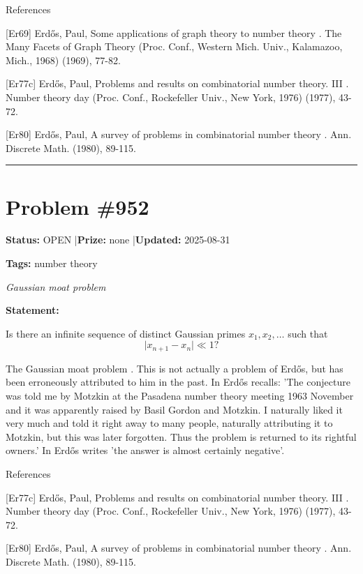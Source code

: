 \documentclass{article}
\begin{document}
References

[Er69] Erd\H{o}s, Paul, Some applications of graph theory to number theory . The Many Facets of Graph Theory (Proc. Conf., Western Mich. Univ., Kalamazoo, Mich., 1968) (1969), 77-82.

[Er77c] Erd\H{o}s, Paul, Problems and results on combinatorial number theory. III . Number theory day (Proc. Conf., Rockefeller Univ., New York, 1976) (1977), 43-72.

[Er80] Erd\H{o}s, Paul, A survey of problems in combinatorial number theory . Ann. Discrete Math. (1980), 89-115.

\noindent\rule{\linewidth}{0.4pt}


\section{Problem \#952}
\label{prob:952}

\noindent\textbf{Status:} OPEN \quad|\quad \textbf{Prize:} none \quad|\quad \textbf{Updated:} 2025-08-31

\noindent\textbf{Tags:} number theory

\medskip
\noindent\textit{Gaussian moat problem}


\noindent\textbf{Statement:}

Is there an infinite sequence of distinct Gaussian primes $x_1,x_2,\ldots$ such that\[\lvert x_{n+1}-x_n\rvert \ll 1?\]




The Gaussian moat problem . This is not actually a problem of Erd\H{o}s, but has been erroneously attributed to him in the past. In \cite{Er77c} Erd\H{o}s recalls: 'The conjecture was told me by Motzkin at the Pasadena number theory meeting 1963 November and it was apparently raised by Basil Gordon and Motzkin. I naturally liked it very much and told it right away to many people, naturally attributing it to Motzkin, but this was later forgotten. Thus the problem is returned to its rightful owners.' In \cite{Er80} Erd\H{o}s writes 'the answer is almost certainly negative'.




References

[Er77c] Erd\H{o}s, Paul, Problems and results on combinatorial number theory. III . Number theory day (Proc. Conf., Rockefeller Univ., New York, 1976) (1977), 43-72.

[Er80] Erd\H{o}s, Paul, A survey of problems in combinatorial number theory . Ann. Discrete Math. (1980), 89-115.
\end{document}
